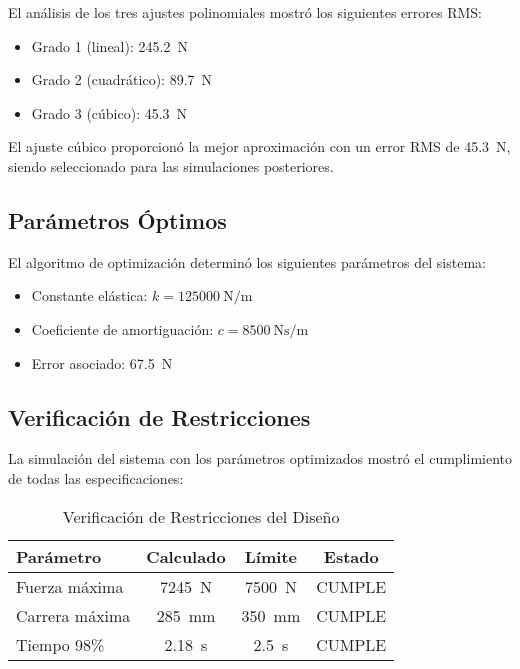 \documentclass[journal]{IEEEtran}
\begin{document}
El análisis de los tres ajustes polinomiales mostró los siguientes errores RMS:
\begin{itemize}
\item Grado 1 (lineal): \SI{245.2}{\newton}
\item Grado 2 (cuadrático): \SI{89.7}{\newton}
\item Grado 3 (cúbico): \SI{45.3}{\newton}
\end{itemize}

El ajuste cúbico proporcionó la mejor aproximación con un error RMS de \SI{45.3}{\newton}, siendo seleccionado para las simulaciones posteriores.

\subsection{Parámetros Óptimos}

El algoritmo de optimización determinó los siguientes parámetros del sistema:
\begin{itemize}
\item Constante elástica: $k = \SI{125000}{\newton\per\meter}$
\item Coeficiente de amortiguación: $c = \SI{8500}{\newton\second\per\meter}$
\item Error asociado: \SI{67.5}{\newton}
\end{itemize}

\subsection{Verificación de Restricciones}

La simulación del sistema con los parámetros optimizados mostró el cumplimiento de todas las especificaciones:

\begin{table}[htbp]
\caption{Verificación de Restricciones del Diseño}
\begin{center}
\begin{tabular}{|l|c|c|c|}
\hline
\textbf{Parámetro} & \textbf{Calculado} & \textbf{Límite} & \textbf{Estado} \\
\hline
Fuerza máxima & \SI{7245}{\newton} & \SI{7500}{\newton} & CUMPLE \\
\hline
Carrera máxima & \SI{285}{\milli\meter} & \SI{350}{\milli\meter} & CUMPLE \\
\hline
Tiempo 98\% & \SI{2.18}{\second} & \SI{2.5}{\second} & CUMPLE \\
\hline
\end{tabular}
\label{tab:verification}
\end{center}
\end{table}
\end{document}
